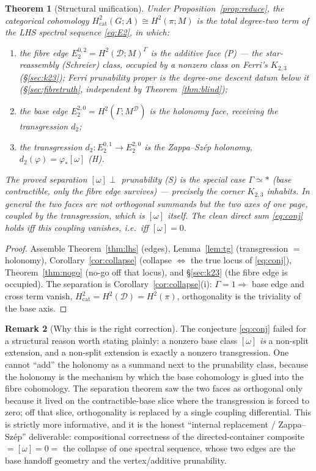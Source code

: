 \documentclass[11pt]{article}
\newtheorem{theorem}{Theorem}
\theoremstyle{definition}
\newtheorem{remark}[theorem]{Remark}
\newcommand{\D}{\mathcal{D}}
\begin{document}
\begin{theorem}[Structural unification]\label{thm:unify}
Under Proposition~\ref{prop:reduce}, the categorical cohomology $H^2_{\mathrm{cat}}(G;A)\cong
H^2(\pi;M)$ is the total degree-two term of the LHS spectral sequence \eqref{eq:E2}, in which:
\begin{enumerate}
\item the \emph{fibre edge} $E_2^{0,2}=H^2(\D;M)^\Gamma$ is the additive face \textup{(P)} ---
the star-reassembly (Schreier) class, occupied by a nonzero class on Ferri's $K_{2,3}$
(\S\ref{sec:k23}); Ferri prunability proper is the degree-one descent datum below it
(\S\ref{sec:fibretruth}, independent by Theorem~\ref{thm:blind});
\item the \emph{base edge} $E_2^{2,0}=H^2(\Gamma;M^\D)$ is the holonomy face, receiving the
transgression $d_2$;
\item the \emph{transgression} $d_2\colon E_2^{0,1}\to E_2^{2,0}$ \emph{is} the Zappa--Sz\'ep
holonomy, $d_2(\varphi)=\varphi_*[\omega]$ \textup{(H)}.
\end{enumerate}
The proved separation $[\omega]\perp$ prunability \textup{(S)} is the special case
$\Gamma\simeq\ast$ (base contractible, only the fibre edge survives) --- precisely the corner
$K_{2,3}$ inhabits. In general the two faces are not orthogonal summands but the two axes of
one page, \emph{coupled} by the transgression, which is $[\omega]$ itself. The clean direct
sum \eqref{eq:conj} holds iff this coupling vanishes, i.e.\ iff $[\omega]=0$.
\end{theorem}
\begin{proof}
Assemble Theorem~\ref{thm:lhs} (edges), Lemma~\ref{lem:tg} (transgression $=$ holonomy),
Corollary~\ref{cor:collapse} (collapse $\Leftrightarrow$ the true locus of \eqref{eq:conj}),
Theorem~\ref{thm:nogo} (no-go off that locus), and \S\ref{sec:k23} (the fibre edge is
occupied). The separation is Corollary~\ref{cor:collapse}(i): $\Gamma=1\Rightarrow$ base edge
and cross term vanish, $H^2_{\mathrm{cat}}=H^2(\D)=H^2(\pi)$, orthogonality is the triviality
of the base axis.
\end{proof}

\begin{remark}[Why this is the right correction]
The conjecture \eqref{eq:conj} failed for a structural reason worth stating plainly: a
nonzero base class $[\omega]$ \emph{is} a non-split extension, and a non-split extension is
exactly a nonzero transgression. One cannot ``add'' the holonomy as a summand next to the
prunability class, because the holonomy is the mechanism by which the base cohomology is
glued into the fibre cohomology. The separation theorem saw the two faces as orthogonal only
because it lived on the contractible-base slice where the transgression is forced to zero;
off that slice, orthogonality is replaced by a single coupling differential. This is strictly
more informative, and it is the honest ``internal replacement / Zappa--Sz\'ep'' deliverable:
compositional correctness of the directed-container composite $=[\omega]=0=$ the collapse of
one spectral sequence, whose two edges are the base handoff geometry and the vertex/additive
prunability.
\end{remark}
\end{document}
